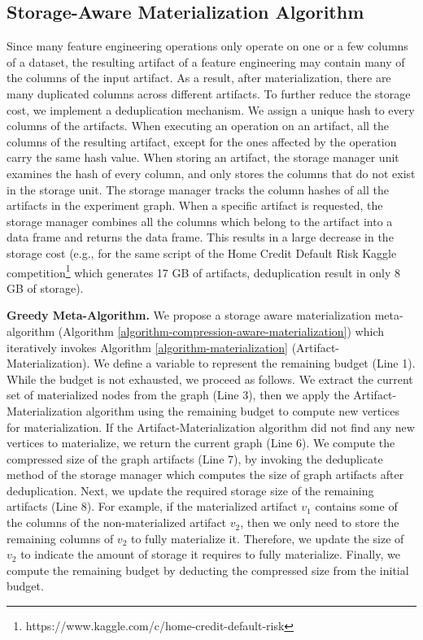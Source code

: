\subsection{Storage-Aware Materialization Algorithm}
Since many feature engineering operations only operate on one or a few columns of a dataset, the resulting artifact of a feature engineering may contain many of the columns of the input artifact.
As a result, after materialization, there are many duplicated columns across different artifacts.
To further reduce the storage cost, we implement a deduplication mechanism.
We assign a unique hash to every columns of the artifacts.
When executing an operation on an artifact, all the columns of the resulting artifact, except for the ones affected by the operation carry the same hash value.
When storing an artifact, the storage manager unit examines the hash of every column, and only stores the columns that do not exist in the storage unit.
The storage manager tracks the column hashes of all the artifacts in the experiment graph.
When a specific artifact is requested, the storage manager combines all the columns which belong to the artifact into a data frame and returns the data frame.
This results in a large decrease in the storage cost (e.g., for the same script of the Home Credit Default Risk Kaggle competition\footnote{https://www.kaggle.com/c/home-credit-default-risk} which generates 17 GB of artifacts, deduplication result in only 8 GB of storage).

\textbf{Greedy Meta-Algorithm.}
We propose a storage aware materialization meta-algorithm (Algorithm \ref{algorithm-compression-aware-materialization}) which iteratively invokes Algorithm \ref{algorithm-materialization} (Artifact-Materialization).
We define a variable to represent the remaining budget (Line 1).
While the budget is not exhausted, we proceed as follows.
We extract the current set of materialized nodes from the graph (Line 3), then we apply the Artifact-Materialization algorithm using the remaining budget to compute new vertices for materialization.
If the Artifact-Materialization algorithm did not find any new vertices to materialize, we return the current graph (Line 6).
We compute the compressed size of the graph artifacts (Line 7), by invoking the deduplicate method of the storage manager which computes the size of graph artifacts after deduplication. 
Next, we update the required storage size of the remaining artifacts (Line 8).
For example, if the materialized artifact $v_1$ contains some of the columns of the non-materialized artifact $v_2$, then we only need to store the remaining columns of $v_2$ to fully materialize it.
Therefore, we update the size of $v_2$ to indicate the amount of storage it requires to fully materialize.
Finally, we compute the remaining budget by deducting the compressed size from the initial budget.

